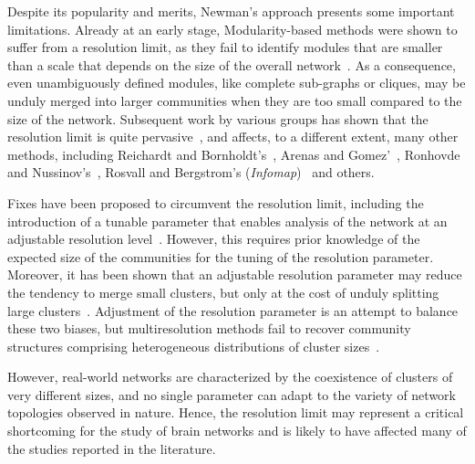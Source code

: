 Despite its popularity and merits, Newman’s approach presents some important limitations.
Already at an early stage, Modularity-based methods were shown to suffer from a resolution limit, as they fail to identify modules that are smaller than a scale that depends on the size of the overall network~\cite{fortunato2007}.
As a consequence, even unambiguously defined modules, like complete sub-graphs or cliques, may be unduly merged into larger communities when they are too small compared to the size of the network. Subsequent work by various groups has shown that the resolution limit is quite pervasive~\cite{lancichinetti2009,traag2011,squartini2015,lancichinetti2011,kawamoto2015}, and affects, to a different extent, many other methods, including Reichardt and Bornholdt’s~\cite{reichardt2006}, Arenas and Gomez'~\cite{arenas2008}, Ronhovde and Nussinov's~\cite{ronhovde2009}, Rosvall and Bergstrom's (\emph{Infomap})~\cite{rosvall2008,kawamoto2015} and others.

Fixes have been proposed to circumvent the resolution limit, including the introduction of a tunable parameter that enables analysis of the network at an adjustable resolution level~\cite{reichardt2006,ronhovde2010,yeo2011}. However, this requires prior knowledge of the expected size of the communities for the tuning of the resolution parameter. Moreover, it has been shown that an  adjustable resolution parameter may reduce the tendency to merge small clusters, but only at the cost of unduly splitting large clusters~\cite{lancichinetti2011}. Adjustment of the resolution parameter is an attempt to balance these two biases, but multiresolution methods fail to recover community structures comprising heterogeneous distributions of cluster sizes~\cite{lancichinetti2011}. 

However, real-world networks are characterized by the coexistence of clusters of very different sizes, and no single parameter can adapt to the variety of network topologies observed in nature.
Hence, the resolution limit may represent a critical shortcoming for the study of brain networks and is likely to have affected many of the studies reported in the literature.


